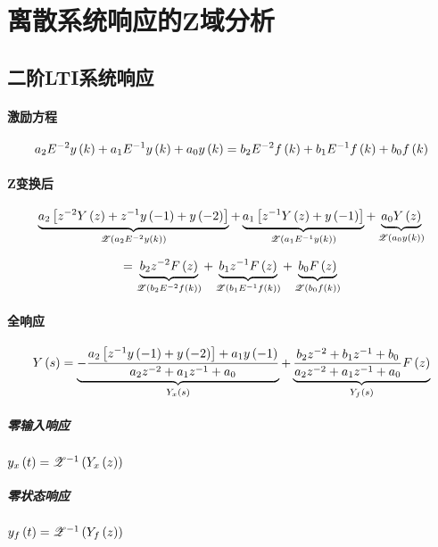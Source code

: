 \documentclass{article}
\begin{document}
\section{离散系统响应的Z域分析}

\subsection{二阶LTI系统响应}

\paragraph{激励方程}

\[a_2E^{-2}y\left(k\right)+a_1E^{-1}y\left(k\right)+a_0y\left(k\right)
    =b_2E^{-2}f\left(k\right)+b_1E^{-1}f\left(k\right)+b_0f\left(k\right)\]

\paragraph{Z变换后}

\[\underbrace{a_2\left[{z^{-2}Y\left(z\right)+z^{-1}y\left(-1\right)+y\left(-2\right)}\right]}_{\mathscr Z\left(a_2E^{-2}y\left(k\right)\right)}
    +\underbrace{a_1\left[{z^{-1}Y\left(z\right)+y\left(-1\right)}\right]}_{\mathscr Z\left(a_1E^{-1}y\left(k\right)\right)}
    +\underbrace{a_0Y\left(z\right)}_{\mathscr Z\left(a_0y\left(k\right)\right)}\]

\[=\underbrace{b_2z^{-2}F\left(z\right)}_{\mathscr Z\left(b_2E^{-2}f\left(k\right)\right)}
    +\underbrace{b_1z^{-1}F\left(z\right)}_{\mathscr Z\left(b_1E^{-1}f\left(k\right)\right)}
    +\underbrace{b_0F\left(z\right)}_{\mathscr Z\left(b_0f\left(k\right)\right)}\]

\paragraph{全响应}

\[Y\left(s\right)
    =\underbrace{-\frac{a_2\left[z^{-1}y\left(-1\right)+y\left(-2\right)\right]+a_1y\left(-1\right)}{a_2z^{-2}+a_1z^{-1}+a_0}}_{Y_x\left(s\right)}
    +\underbrace{\frac{b_2z^{-2}+b_1z^{-1}+b_0}{a_2z^{-2}+a_1z^{-1}+a_0}F\left(z\right)}_{Y_f\left(s\right)}\]

\subparagraph{零输入响应}

$y_x\left(t\right)=\mathscr Z^{-1}\left(Y_x\left(z\right)\right)$

\subparagraph{零状态响应}

$y_f\left(t\right)=\mathscr Z^{-1}\left(Y_f\left(z\right)\right)$
\end{document}
